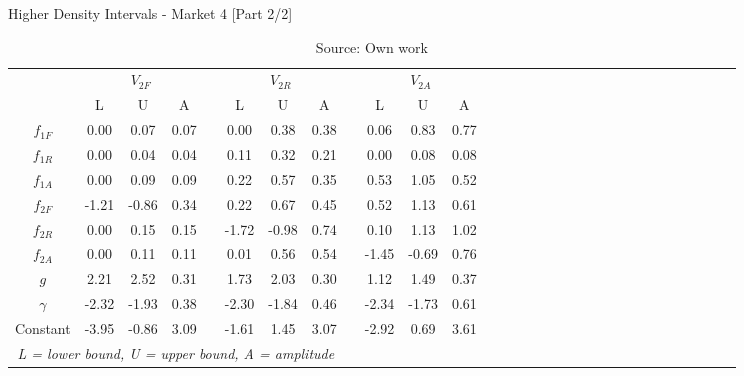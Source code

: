 \begin{table}
\caption{Higher Density Intervals -  Market 4 [Part 2/2]}
\centering
\begin{tabular}{cccccccccccccccccccccccccccccc}
  \toprule
 & \multicolumn{3}{c}{$V_{2F}$} && \multicolumn{3}{c}{$V_{2R}$} && \multicolumn{3}{c}{$V_{2A}$}\\ 
\cline{2-4} \cline{6-8} \cline{10-12} 
            & L  & U   & A &&  L  & U   & A &&  L  & U   & A\\
  \hline
  $f_{1F}$ & 0.00  & 0.07  & 0.07 && 0.00  & 0.38  & 0.38 && 0.06  & 0.83  & 0.77 \\   
  $f_{1R}$ & 0.00  & 0.04  & 0.04 && 0.11  & 0.32  & 0.21 && 0.00  & 0.08  & 0.08 \\   
  $f_{1A}$ & 0.00  & 0.09  & 0.09 && 0.22  & 0.57  & 0.35 && 0.53  & 1.05  & 0.52 \\   
  $f_{2F}$ & -1.21 & -0.86 & 0.34 && 0.22  & 0.67  & 0.45 && 0.52  & 1.13  & 0.61 \\   
  $f_{2R}$ & 0.00  & 0.15  & 0.15 && -1.72 & -0.98 & 0.74 && 0.10  & 1.13  & 1.02 \\   
  $f_{2A}$ & 0.00  & 0.11  & 0.11 && 0.01  & 0.56  & 0.54 && -1.45 & -0.69 & 0.76 \\   
  $g$      & 2.21  & 2.52  & 0.31 && 1.73  & 2.03  & 0.30 && 1.12  & 1.49  & 0.37 \\   
  $\gamma$ & -2.32 & -1.93 & 0.38 && -2.30 & -1.84 & 0.46 && -2.34 & -1.73 & 0.61 \\   
  Constant & -3.95 & -0.86 & 3.09 && -1.61 & 1.45  & 3.07 && -2.92 & 0.69  & 3.61 \\   
  \hline
  \multicolumn{8}{c}{\textit{L = lower bound, U = upper bound, A = amplitude}}\\
  \bottomrule
 \end{tabular}
\caption*{Source: Own work}
\end{table}
